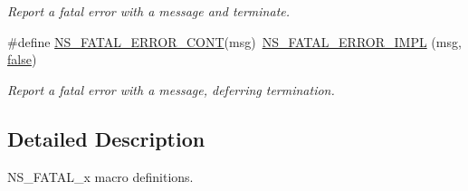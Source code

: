 \begin{DoxyCompactItemize}
\begin{DoxyCompactList}\small\item\em Report a fatal error with a message and terminate. \end{DoxyCompactList}\item 
\#define \hyperlink{group__fatal_ga14a612271304da0eaf6d5018c0b5b5a5}{N\+S\+\_\+\+F\+A\+T\+A\+L\+\_\+\+E\+R\+R\+O\+R\+\_\+\+C\+O\+NT}(msg)~\hyperlink{group__fatal_gadb2a57b89e19d41a406ce49bb3d77664}{N\+S\+\_\+\+F\+A\+T\+A\+L\+\_\+\+E\+R\+R\+O\+R\+\_\+\+I\+M\+PL} (msg, \hyperlink{lte__cqi__generation_8m_ab1bef239d413c4da139c4bac92cd657a}{false})
\begin{DoxyCompactList}\small\item\em Report a fatal error with a message, deferring termination. \end{DoxyCompactList}\end{DoxyCompactItemize}


\subsection{Detailed Description}
{\ttfamily N\+S\+\_\+\+F\+A\+T\+A\+L\+\_\+x} macro definitions. 

